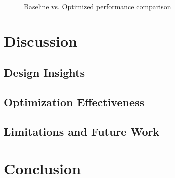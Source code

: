 \documentclass[12pt,letterpaper]{article}
\begin{document}
\begin{figure}[H]
    \centering
    \caption{Baseline vs. Optimized performance comparison}
    \label{fig:comparison}
\end{figure}

\section{Discussion}
\label{sec:discussion}


\subsection{Design Insights}

\subsection{Optimization Effectiveness}

\subsection{Limitations and Future Work}

\section{Conclusion}
\label{sec:conclusion}

\end{document}
